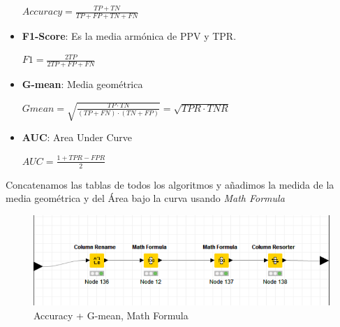 \begin{itemize}
		$Accuracy=\frac{TP+TN}{TP+FP+TN+FN}$
		
		\item \textbf{F1-Score}: Es la media armónica de PPV y TPR.
		
		$F1=\frac{2TP}{2TP+FP+FN}$


		\item \textbf{G-mean}: Media geométrica
		
		$Gmean=\sqrt{ \frac{TP \cdot TN}{(TP+FN)\cdot(TN+FP)}} = \sqrt{TPR \cdot TNR}$
	
	
		\item \textbf{AUC}: Area Under Curve
		
		$AUC=\frac{1+TPR-FPR}{2}$
	\end{itemize}
	
	
	Concatenamos las tablas de todos los algoritmos y añadimos la medida de la media geométrica y del Área bajo la curva usando \textit{Math Formula}
	
	\begin{figure}[H]
		\centering
		\includegraphics[width=1\textwidth]{img/math.png}
		\caption{Accuracy + G-mean, Math Formula}
	\end{figure}


